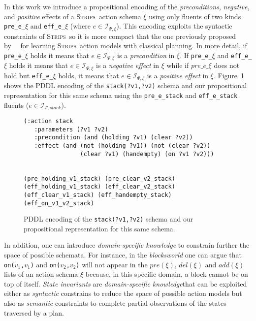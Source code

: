 \documentclass{article}
\newcommand{\strips}{\textsc{Strips}}
\begin{document}
In this work we introduce a propositional encoding of the {\em preconditions}, {\em negative}, and {\em positive} effects of a \strips\ action schema $\xi$ using only fluents of two kinds {\tt\small pre\_e\_$\xi$} and {\tt\small eff\_e\_$\xi$} (where $e\in{\mathcal I}_{\Psi,\xi}$). This encoding exploits the syntactic constraints of \strips\, so it is more compact that the one previously proposed by~\citeauthor{aineto2018learning}~\citeyear{aineto2018learning} for learning \strips\ action models with classical planning. In more detail, if {\tt\small pre\_e\_$\xi$} holds it means that $e\in{\mathcal I}_{\Psi,\xi}$ is a {\em precondition} in $\xi$. If {\tt\small pre\_e\_$\xi$} and {\tt\small eff\_e\_$\xi$} holds it means that $e\in{\mathcal I}_{\Psi,\xi}$ is a {\em negative effect} in $\xi$ while if $pre\_e\_\xi$ does not hold but {\tt\small eff\_e\_$\xi$} holds, it means that $e\in{\mathcal I}_{\Psi,\xi}$ is a {\em positive effect} in $\xi$. Figure~\ref{fig:propositional} shows the PDDL encoding of the {\tt\small stack(?v1,?v2)} schema and our propositional representation for this same schema using the {\tt\small pre\_e\_stack} and {\tt\small eff\_e\_stack} fluents ($e\in{\mathcal I}_{\Psi,stack}$).

\begin{figure}
  \begin{tiny}  
  \begin{verbatim}
(:action stack
   :parameters (?v1 ?v2)
   :precondition (and (holding ?v1) (clear ?v2))
   :effect (and (not (holding ?v1)) (not (clear ?v2))
                (clear ?v1) (handempty) (on ?v1 ?v2)))


(pre_holding_v1_stack) (pre_clear_v2_stack)
(eff_holding_v1_stack) (eff_clear_v2_stack)
(eff_clear_v1_stack) (eff_handempty_stack) (eff_on_v1_v2_stack)
  \end{verbatim}           
  \end{tiny}  
 \caption{\small PDDL encoding of the {\tt\small stack(?v1,?v2)} schema and our propositional representation for this same schema.}
\label{fig:propositional}
\end{figure}

In addition, one can introduce {\em domain-specific knowledge} to constrain further the space of possible schemata. For instance, in the {\em blocksworld} one can argue that {\small\tt on($v_1$,$v_1$)} and {\small\tt on($v_2$,$v_2$)} will not appear in the $pre(\xi)$, $del(\xi)$ and $add(\xi)$ lists of an action schema $\xi$ because, in this specific domain, a block cannot be on top of itself. {\it State invariants} are {\em domain-specific knowledge}that can be exploited either as {\em syntactic} constrains to reduce the space of possible action models but also as {\em semantic} constraints to complete partial observations of the states traversed by a plan. 
\end{document}
